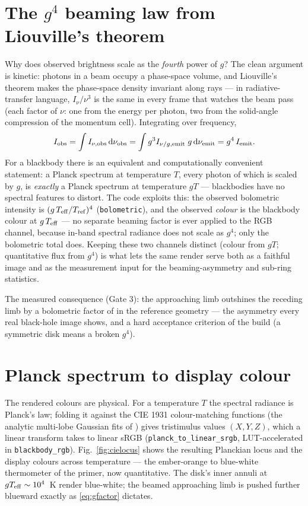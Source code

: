 \section{The $g^4$ beaming law from Liouville's theorem}
\label{sec:gfour}

Why does observed brightness scale as the \emph{fourth} power of $g$?
The clean argument is kinetic: photons in a beam occupy a phase-space
volume, and Liouville's theorem makes the phase-space density invariant
along rays — in radiative-transfer language, $I_\nu/\nu^3$ is the same
in every frame that watches the beam pass (each factor of $\nu$: one
from the energy per photon, two from the solid-angle compression of the
momentum cell). Integrating over frequency,
\begin{equation}
I_{\rm obs} = \int I_{\nu,\rm obs}\,\mathrm{d}\nu_{\rm obs}
= \int g^3 I_{\nu/g,\rm emit}\; g\,\mathrm{d}\nu_{\rm emit}
= g^4\,I_{\rm emit}.
\label{eq:gfour}
\end{equation}
For a blackbody there is an equivalent and computationally convenient
statement: a Planck spectrum at temperature $T$, every photon of which
is scaled by $g$, is \emph{exactly} a Planck spectrum at temperature
$gT$ — blackbodies have no spectral features to distort. The code
exploits this: the observed bolometric intensity is
$(g\,T_{\rm eff}/T_{\rm ref})^4$ (\texttt{bolometric}), and the observed
\emph{colour} is the blackbody colour at $g\,T_{\rm eff}$ — no separate
beaming factor is ever applied to the RGB channel, because in-band
spectral radiance does not scale as $g^4$; only the bolometric total
does. Keeping these two channels distinct (colour from $g T$;
quantitative flux from $g^4$) is what lets the same render serve both as
a faithful image and as the measurement input for the beaming-asymmetry
and sub-ring statistics.

The measured consequence (Gate 3): the approaching limb outshines the
receding limb by a bolometric factor of \BeamRatio{} in the reference
geometry — the asymmetry every real black-hole image shows, and a hard
acceptance criterion of the build (a symmetric disk means a broken
$g^4$).

\section{Planck spectrum to display colour}
\label{sec:cie}

The rendered colours are physical. For a temperature $T$ the spectral
radiance is Planck's law; folding it against the CIE 1931 colour-matching
functions (the analytic multi-lobe Gaussian fits of
\citealt{WymanSloanShirley2013}) gives tristimulus values $(X, Y, Z)$,
which a linear transform takes to linear sRGB
(\texttt{planck\_to\_linear\_srgb}, LUT-accelerated in
\texttt{blackbody\_rgb}). Fig.~\ref{fig:cielocus} shows the resulting
Planckian locus and the display colours across temperature — the
ember-orange to blue-white thermometer of the primer, now quantitative.
The disk's inner annuli at $g T_{\rm eff} \sim 10^4$~K render
blue-white; the beamed approaching limb is pushed further blueward
exactly as \eqref{eq:gfactor} dictates.

